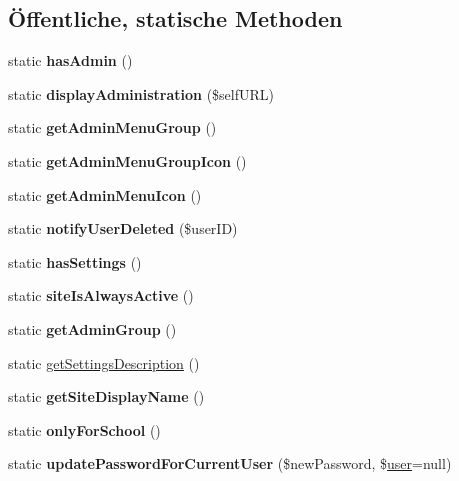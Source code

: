 \subsection*{Öffentliche, statische Methoden}
\begin{DoxyCompactItemize}
\item 
\mbox{\label{classnextcloud_a9722b3f9e3b00c01ee256ae02ee01579}} 
static {\bfseries has\+Admin} ()
\item 
\mbox{\label{classnextcloud_a5cb93c75f9761abe7370954f194ec8fc}} 
static {\bfseries display\+Administration} (\$self\+U\+RL)
\item 
\mbox{\label{classnextcloud_a39ad28d6879a8681a2fc36d768ec02fc}} 
static {\bfseries get\+Admin\+Menu\+Group} ()
\item 
\mbox{\label{classnextcloud_ae4ddeeb0fcd5ce1003f7a453f2487b58}} 
static {\bfseries get\+Admin\+Menu\+Group\+Icon} ()
\item 
\mbox{\label{classnextcloud_a7040d66cddaebae683db17aa662e845f}} 
static {\bfseries get\+Admin\+Menu\+Icon} ()
\item 
\mbox{\label{classnextcloud_a55900bf924de518da9f8b6dfa155e8e3}} 
static {\bfseries notify\+User\+Deleted} (\$user\+ID)
\item 
\mbox{\label{classnextcloud_a7c3da9c4a5d038a63c0ffd9ab6b199fd}} 
static {\bfseries has\+Settings} ()
\item 
\mbox{\label{classnextcloud_a0bb6a5a5d038c447ec609eebe36661d3}} 
static {\bfseries site\+Is\+Always\+Active} ()
\item 
\mbox{\label{classnextcloud_a1e48a8741439b48789b35de42233ecb5}} 
static {\bfseries get\+Admin\+Group} ()
\item 
static \mbox{\hyperlink{classnextcloud_a97fe0ca8c7e3e973b531c315ffc17856}{get\+Settings\+Description}} ()
\item 
\mbox{\label{classnextcloud_afa5ffacb051fd8746de396a1d6dd95aa}} 
static {\bfseries get\+Site\+Display\+Name} ()
\item 
\mbox{\label{classnextcloud_a697fd24d7425ba580e834b102be8ff1e}} 
static {\bfseries only\+For\+School} ()
\item 
\mbox{\label{classnextcloud_a410fbbd496a6916db2e5c534415fcdfe}} 
static {\bfseries update\+Password\+For\+Current\+User} (\$new\+Password, \$\mbox{\hyperlink{classuser}{user}}=null)
\end{DoxyCompactItemize}
